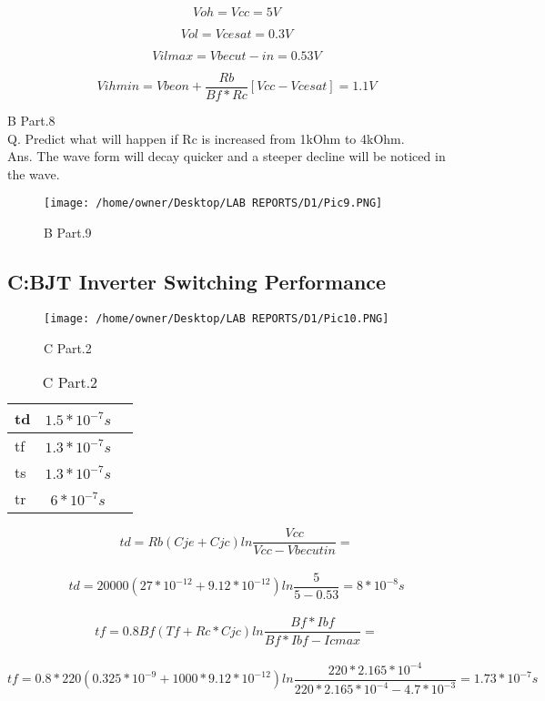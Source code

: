\documentclass{article}
\begin{document}
$$Voh=Vcc=5V$$

$$Vol=Vcesat=0.3V$$

$$Vil max=Vbe cut-in=0.53V$$

$$Vih min = Vbe on + \frac{Rb}{Bf*Rc}[Vcc-Vcesat]=1.1V$$

B Part.8\\
Q. Predict what will happen if Rc is increased from 1kOhm to 4kOhm.\\
Ans. The wave form will decay quicker and a steeper decline will be noticed in the wave.


\begin{figure}[H]
	\centering
	\texttt{[image: /home/owner/Desktop/LAB REPORTS/D1/Pic9.PNG]}
	\caption[B Part.9 Plot]{B Part.9}
	\label{fig:pic}
\end{figure}

\subsection{C:BJT Inverter Switching Performance}

\begin{figure}[H]
	\centering
	\texttt{[image: /home/owner/Desktop/LAB REPORTS/D1/Pic10.PNG]}
	\caption[C Part.2 Plot]{C Part.2}
	\label{fig:pic}
\end{figure}


\begin{table}[H]
	\centering
	\label{tab:sixthTable}
	\caption[C Part.2 Table]{C Part.2}
	\begin{tabular}{lcr}
		td&$1.5*10^{-7}s$ \\ \hline
		tf&$1.3*10^{-7}s$ \\ \hline
		ts&$1.3*10^{-7}s$ \\ \hline
		tr&$6*10^{-7}s$ \\ \hline

	\end{tabular}
\end{table}

$$td=Rb(Cje+Cjc)ln\frac{Vcc}{Vcc-Vbe cutin}=$$\\

$$td=20000(27*10^{-12}+9.12*10^{-12})ln\frac{5}{5-0.53}=8*10^{-8}s$$\\

$$tf=0.8Bf(Tf+Rc*Cjc)ln\frac{Bf*Ibf}{Bf*Ibf-Icmax}=$$ \\

$$tf=0.8*220(0.325*10^{-9}+1000*9.12*10^{-12})ln\frac{220*2.165*10^{-4}}{220*2.165*10^{-4}-4.7*10^{-3}}=1.73*10^{-7}s$$\\
\end{document}
